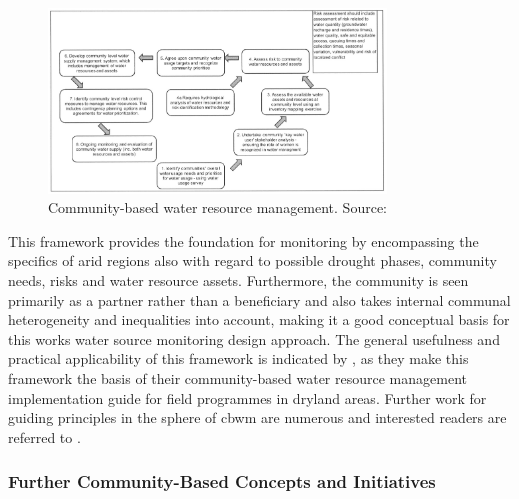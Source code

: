 \begin{figure}[!hbp]
    \centering
    \includegraphics[width=0.8\textwidth]{figures/2023_MA_th_day_iwrm.jpg}
    \decoRule
    \caption[Community-based water resource management]{Community-based water resource management. Source: \textcite{dayCommunitybasedWaterResources2009}}
    \label{fig:th_day_iwrm}
\end{figure}

This framework provides the foundation for monitoring by encompassing the specifics of arid regions also with regard to possible drought phases, community needs, risks and water resource assets. Furthermore, the community is seen primarily as a partner rather than a beneficiary and also takes internal communal heterogeneity and inequalities into account, making it a good conceptual basis for this works water source monitoring design approach. The general usefulness and practical applicability of this framework is indicated by \autocite{oxfamIntroductionCommunityBasedWater2009}, as they make this framework the basis of their community-based water resource management implementation guide for field programmes in dryland areas. Further work for guiding principles in the sphere of \acrshort{cbwm} are numerous and interested readers are referred to \autocite{westonCommunityBasedWaterMonitoring2015}.

\subsubsection*{Further Community-Based Concepts and Initiatives}\label{subsec:cbc} %

